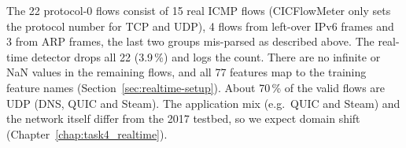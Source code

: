 The 22 protocol-0 flows consist of 15 real ICMP flows (CICFlowMeter only sets the protocol number for TCP and UDP), 4 flows from left-over IPv6 frames and 3 from ARP frames, the last two groups mis-parsed as described above. The real-time detector drops all 22 (3.9\,\%) and logs the count. There are no infinite or NaN values in the remaining flows, and all 77 features map to the training feature names (Section~\ref{sec:realtime-setup}). About 70\,\% of the valid flows are UDP (DNS, QUIC and Steam). The application mix (e.g.\ QUIC and Steam) and the network itself differ from the 2017 testbed, so we expect domain shift (Chapter~\ref{chap:task4_realtime}).


\FloatBarrier
